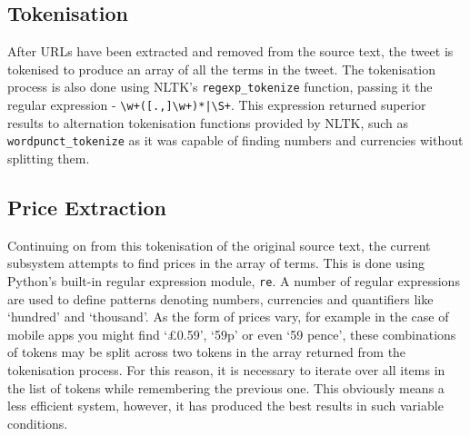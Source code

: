 \subsection{Tokenisation}
After URLs have been extracted and removed from the source text, the tweet is tokenised to produce an array of all the terms in the tweet. The tokenisation process is also done using NLTK's \texttt{regexp\_tokenize} function, passing it the regular expression - \verb/\w+([.,]\w+)*|\S+/. This expression returned superior results to alternation tokenisation functions provided by NLTK, such as \texttt{wordpunct\_tokenize} as it was capable of finding numbers and currencies without splitting them.

\subsection{Price Extraction}
Continuing on from this tokenisation of the original source text, the current subsystem attempts to find prices in the array of terms. This is done using Python's built-in regular expression module,
 \texttt{re}. %
A number of regular expressions are used to define patterns denoting numbers, currencies and quantifiers like `hundred' and `thousand'. As the form of prices vary, for example in the case of mobile apps you might find `£0.59', `59p' or even `59 pence', these combinations of tokens may be split across two tokens in the array returned from the tokenisation process. For this reason, it is necessary to iterate over all items in the list of tokens while remembering the previous one. This obviously means a less efficient system, however, it has produced the best results in such variable conditions.


